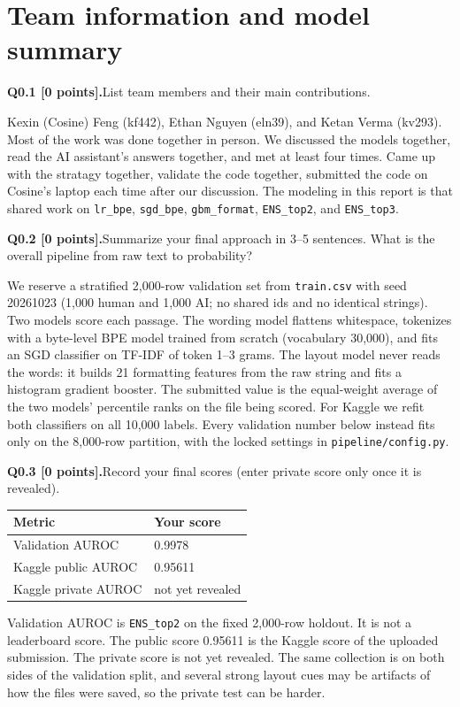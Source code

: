 \documentclass[11pt,letterpaper]{article}
\newcommand{\question}[2]{\needspace{4\baselineskip}\par\addvspace{0.45em}\noindent\textbf{#1}\quad #2\par\nobreak\vspace{0.1em}}
\newcommand{\smallnote}[1]{{\small\color{muted}#1}}
\begin{document}
\section{Team information and model summary}
\question{Q0.1 [0 points].}{List team members and their main contributions.}

Kexin (Cosine) Feng (kf442), Ethan Nguyen (eln39), and Ketan Verma (kv293). Most of the work was done together in person. We discussed the models together, read the AI assistant's answers together, and met at least four times. Came up with the stratagy together, validate the code together, submitted the code on Cosine's laptop each time after our discussion. The modeling in this report is that shared work on \texttt{lr\_bpe}, \texttt{sgd\_bpe}, \texttt{gbm\_format}, \texttt{ENS\_top2}, and \texttt{ENS\_top3}.

\question{Q0.2 [0 points].}{Summarize your final approach in 3--5 sentences. What is the overall pipeline from raw text to probability?}

We reserve a stratified 2{,}000-row validation set from \texttt{train.csv} with seed 20261023 (1{,}000 human and 1{,}000 AI; no shared ids and no identical strings). Two models score each passage. The wording model flattens whitespace, tokenizes with a byte-level BPE model trained from scratch (vocabulary 30{,}000), and fits an SGD classifier on TF-IDF of token 1--3 grams. The layout model never reads the words: it builds 21 formatting features from the raw string and fits a histogram gradient booster. The submitted value is the equal-weight average of the two models' percentile ranks on the file being scored. For Kaggle we refit both classifiers on all 10{,}000 labels. Every validation number below instead fits only on the 8{,}000-row partition, with the locked settings in \texttt{pipeline/config.py}.

\question{Q0.3 [0 points].}{Record your final scores (enter private score only once it is revealed).}
\begin{tabularx}{\linewidth}{@{}Yp{1.8in}@{}}\toprule Metric & Your score \\ \midrule
Validation AUROC & 0.9978 \\
Kaggle public AUROC & 0.95611 \\
Kaggle private AUROC & not yet revealed \\
\bottomrule\end{tabularx}

\smallnote{Validation AUROC is \texttt{ENS\_top2} on the fixed 2{,}000-row holdout. It is not a leaderboard score. The public score 0.95611 is the Kaggle score of the uploaded submission. The private score is not yet revealed. The same collection is on both sides of the validation split, and several strong layout cues may be artifacts of how the files were saved, so the private test can be harder.}
\end{document}
